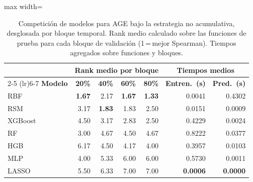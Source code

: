 \begin{table}[H]
    \centering
    \small
    \setlength{\tabcolsep}{4pt}
    \begin{adjustbox}{max width=\textwidth}
        \begin{tabular}{lrrrr|rr}
            \toprule
            \multicolumn{1}{l}{} & \multicolumn{4}{c}{\textbf{Rank medio por bloque}} & \multicolumn{2}{c}{\textbf{Tiempos medios}}                                                                               \\
            \cmidrule(lr){2-5} \cmidrule(lr){6-7}
            \textbf{Modelo}      & \textbf{20\%}                                      & \textbf{40\%}                               & \textbf{60\%} & \textbf{80\%} & \textbf{Entren.\ (s)} & \textbf{Pred.\ (s)} \\
            \midrule
            RBF                  & \textbf{1.67}                                      & 2.17                                        & \textbf{1.67} & \textbf{1.33} & 0.0041                & 0.4302              \\
            RSM                  & 3.17                                               & \textbf{1.83}                               & 1.83          & 2.50          & 0.0151                & 0.0009              \\
            XGBoost              & 4.50                                               & 3.17                                        & 2.83          & 2.50          & 0.4229                & 0.0024              \\
            RF                   & 3.00                                               & 4.67                                        & 4.50          & 4.67          & 0.8222                & 0.0377              \\
            HGB                  & 6.17                                               & 4.50                                        & 4.17          & 4.00          & 0.3957                & 0.0103              \\
            MLP                  & 4.00                                               & 5.33                                        & 6.00          & 6.00          & 0.5730                & 0.0011              \\
            LASSO                & 5.50                                               & 6.33                                        & 7.00          & 7.00          & \textbf{0.0006}       & \textbf{0.0000}     \\
            \bottomrule
        \end{tabular}
    \end{adjustbox}
    \caption{Competición de modelos para AGE bajo la estrategia no acumulativa, desglosada por bloque temporal. Rank medio calculado sobre las funciones de prueba para cada bloque de validación (1\,=\,mejor Spearman). Tiempos agregados sobre funciones y bloques.}
    \label{tab:comparativa_modelos_bloques_age}
\end{table}

